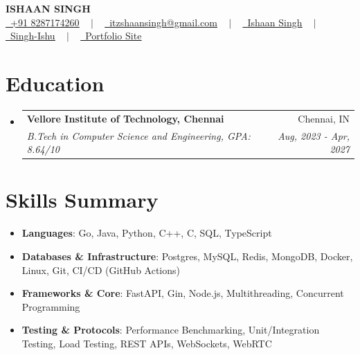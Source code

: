 \documentclass[a4paper,10pt]{extarticle}
\makeatletter
\newcommand{\resumeItem}[2]{
  \item\normalsize{
    \textbf{#1}{: #2 \vspace{-2pt}}
  }
}
\newcommand{\resumeSubheading}[4]{
  \vspace{-1pt}\item
  \begin{tabular*}{\textwidth}{l@{\extracolsep{\fill}}r}
    \textbf{#1} & #2 \\
    \textit{#3} & \textit{#4} \\
  \end{tabular*}\vspace{-5pt}
}
\newcommand{\resumeSubHeadingListStart}{\begin{itemize}[leftmargin=0in, label={}]}
\newcommand{\resumeSubHeadingListEnd}{\end{itemize}}
\makeatother
\begin{document}
\begin{center}
  \LARGE \textbf{ISHAAN SINGH} \\ \vspace{5pt}
  \normalsize
  \href{tel:+918287174260}{\raisebox{-0.2\height}\faPhone\ \underline{+91 8287174260}} ~ $\vert$ ~
  \href{mailto:itzshaansingh@gmail.com}{\raisebox{-0.2\height}\faEnvelope\ \underline{itzshaansingh@gmail.com}} ~ $\vert$ ~ 
  \href{https://www.linkedin.com/in/ishaan-singh-174123293/}{\raisebox{-0.2\height}\faLinkedin\ \underline{Ishaan Singh}} ~ $\vert$ ~
  \href{https://github.com/Singh-Ishu}{\raisebox{-0.2\height}\faGithub\ \underline{Singh-Ishu}} ~ $\vert$ ~
  \href{https://singh-ishu.is-a.dev}{\raisebox{-0.2\height}\faGlobe\ \underline{Portfolio Site}}
\end{center}

\section{Education}
\resumeSubHeadingListStart
\resumeSubheading
{Vellore Institute of Technology, Chennai}{Chennai, IN}
{B.Tech in Computer Science and Engineering, GPA: 8.64/10}{Aug, 2023 - Apr, 2027}
\resumeSubHeadingListEnd

\section{Skills Summary}
\resumeSubHeadingListStart
\resumeItem{Languages}{Go, Java, Python, C++, C, SQL, TypeScript}
\vspace{-2pt}
\resumeItem{Databases \& Infrastructure}{Postgres, MySQL, Redis, MongoDB, Docker, Linux, Git, CI/CD (GitHub Actions)}
\vspace{-2pt}
\resumeItem{Frameworks \& Core}{FastAPI, Gin, Node.js, Multithreading, Concurrent Programming}
\vspace{-2pt}
\resumeItem{Testing \& Protocols}{Performance Benchmarking, Unit/Integration Testing, Load Testing, REST APIs, WebSockets, WebRTC}
\resumeSubHeadingListEnd

\end{document}

